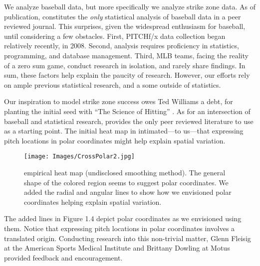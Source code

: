
We analyze baseball data, but more specifically we analyze strike zone data. As of publication, \cite{Cross2015} constitutes the {\it only} statistical analysis of baseball data in a peer reviewed journal. This surprises, given the widespread enthusiasm for baseball, until considering a few obstacles. First, PITCHf/x\textsuperscript{\textregistered} data collection began relatively recently, in 2008. Second, analysis requires proficiency in statistics, programming, and database management. Third, MLB teams, facing the reality of a zero sum game, conduct research in isolation, and rarely share findings. In sum, these factors help explain the paucity of research. However, our efforts rely on ample previous statistical research, and a some outside of statistics.

Our inspiration to model strike zone success owes Ted Williams a debt, for planting the initial seed with ``The Science of Hitting'' \citep{Williams1971}. As for an intersection of baseball and statistical research, \cite{Cross2015} provides the only peer reviewed literature to use as a starting point. The initial heat map in \cite{Cross2015} intimated---to us---that expressing pitch locations in polar coordinates might help explain spatial variation. 
        \begin{figure}[H]
      	\centering
      	\texttt{[image: Images/CrossPolar2.jpg]} 
      	\caption{\cite{Cross2015} empirical heat map (undisclosed smoothing method). The general shape of the colored region seems to suggest polar coordinates. We added the radial and angular lines to show how we envisioned polar coordinates helping explain spatial variation.}
      	\end{figure}
The added lines in Figure 1.4 depict polar coordinates as we envisioned using them. Notice that expressing pitch locations in polar coordinates involves a translated origin. Conducting research into this non-trivial matter, Glenn Fleisig at the American Sports Medical Institute \citep{Fleisig2002} and Brittany Dowling at Motus \citep{Dowling2016} provided feedback and encouragement. 

